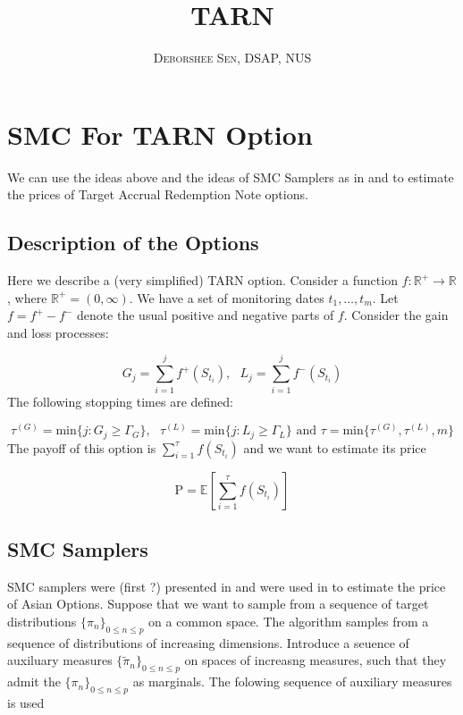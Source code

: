\documentclass{article}
\begin{document}
\title{TARN}
\author{\textsc{Deborshee Sen, DSAP, NUS}}
\maketitle

\tableofcontents
\newpage

\section{SMC For TARN Option}
We can use the ideas above and the ideas of SMC Samplers as in \cite{SMC_option_jasra} and to estimate the prices of Target Accrual Redemption Note options.

\subsection{Description of the Options}

Here we describe a (very simplified) TARN option. Consider a function $f : \mathbb{R}^{+} \rightarrow \mathbb{R}$, where $\mathbb{R}^{+} = (0, \infty)$. We have a set of monitoring dates $t_{1}, \ldots, t_{m}$. Let $f = f^{+} - f^{-}$ denote the usual positive and negative parts of $f$. Consider the gain and loss processes:

\begin{equation} \label{eq:gain_and_loss}
G_{j} = \sum_{i=1}^{j} f^{+}(S_{t_{i}}), \text{ } L_{j} = \sum_{i=1}^{j} f^{-}(S_{t_{i}}) 
\end{equation} 
The following stopping times are defined: 

\begin{equation} \label{eq:stopping_times}
\tau^{(G)} = \text{min} \{j : G_{j} \geq \Gamma_{G} \}, \text{ } \tau^{(L)} = \text{min} \{j : L_{j} \geq \Gamma_{L} \} \text{ and } \tau = \text{min} \{ \tau^{(G)}, \tau^{(L)}, m \} 
\end{equation}
The payoff of this option is $\sum_{i=1}^{\tau} f(S_{t_{i}})$ and we want to estimate its price 

\begin{equation} \label{eq:price_TARN} 
\text{P} = \mathbb{E} \left [ \sum_{i=1}^{\tau} f(S_{t_{i}}) \right ] 
\end{equation}

\subsection{SMC Samplers} 
SMC samplers were (first ?) presented in \cite{SMC_samplers} and were used in \cite{SMC_option_jasra} to estimate the price of Asian Options. Suppose that we want to sample from a sequence of target distributions $\{ \pi_{n} \}_{0 \leq n \leq p}$ on a common space. The algorithm samples from a sequence of distributions of increasing dimensions. Introduce a seuence of auxiluary measures $\{ \tilde{\pi}_{n} \}_{0 \leq n \leq p}$ on spaces of increasng measures, such that they admit the $\{ \pi_{n} \}_{0 \leq n \leq p}$ as marginals. The folowing sequence of auxiliary measures is used 
\end{document}
